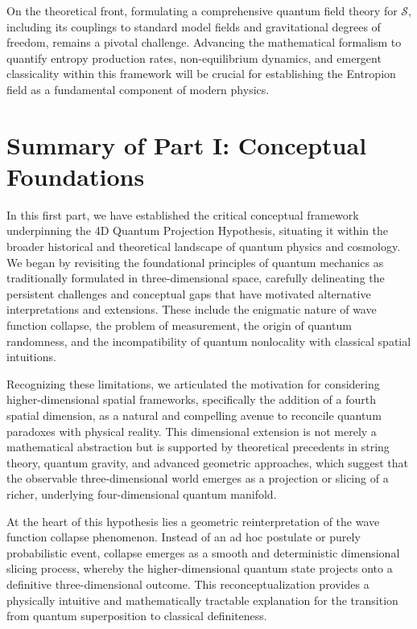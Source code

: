 \documentclass[12pt]{article}
\begin{document}
On the theoretical front, formulating a comprehensive quantum field theory for $\mathcal{S}$, including its couplings to standard model fields and gravitational degrees of freedom, remains a pivotal challenge. Advancing the mathematical formalism to quantify entropy production rates, non-equilibrium dynamics, and emergent classicality within this framework will be crucial for establishing the Entropion field as a fundamental component of modern physics.

\section*{Summary of Part I: Conceptual Foundations}

In this first part, we have established the critical conceptual framework underpinning the 4D Quantum Projection Hypothesis, situating it within the broader historical and theoretical landscape of quantum physics and cosmology. We began by revisiting the foundational principles of quantum mechanics as traditionally formulated in three-dimensional space, carefully delineating the persistent challenges and conceptual gaps that have motivated alternative interpretations and extensions. These include the enigmatic nature of wave function collapse, the problem of measurement, the origin of quantum randomness, and the incompatibility of quantum nonlocality with classical spatial intuitions.

Recognizing these limitations, we articulated the motivation for considering higher-dimensional spatial frameworks, specifically the addition of a fourth spatial dimension, as a natural and compelling avenue to reconcile quantum paradoxes with physical reality. This dimensional extension is not merely a mathematical abstraction but is supported by theoretical precedents in string theory, quantum gravity, and advanced geometric approaches, which suggest that the observable three-dimensional world emerges as a projection or slicing of a richer, underlying four-dimensional quantum manifold.

At the heart of this hypothesis lies a geometric reinterpretation of the wave function collapse phenomenon. Instead of an ad hoc postulate or purely probabilistic event, collapse emerges as a smooth and deterministic dimensional slicing process, whereby the higher-dimensional quantum state projects onto a definitive three-dimensional outcome. This reconceptualization provides a physically intuitive and mathematically tractable explanation for the transition from quantum superposition to classical definiteness.
\end{document}
